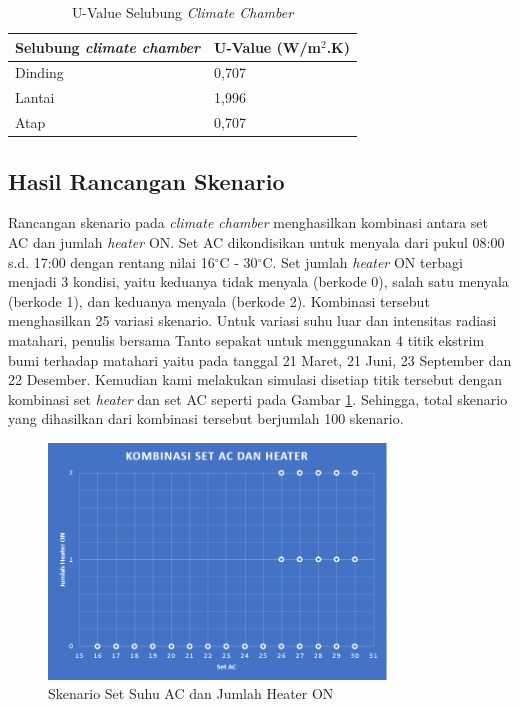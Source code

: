 \begin{table}[hbt!]
	\caption{U-Value Selubung \textit{Climate Chamber}}
	\label{tbl:5:UValue}
	\centering
	\begin{tabular}{|l|l|}
		\hline
		\textbf{Selubung \textit{climate chamber}} & \textbf{U-Value (W/m$^2$.K)} \\ \hline
		Dinding & 0,707 \\ \hline
		Lantai  & 1,996 \\ \hline
		Atap    & 0,707 \\ \hline
	\end{tabular}
\end{table}

\subsection{Hasil Rancangan Skenario}
Rancangan skenario pada \textit{climate chamber} menghasilkan kombinasi antara set AC dan jumlah \textit{heater} ON. Set AC dikondisikan untuk menyala dari pukul 08:00 s.d. 17:00 dengan rentang nilai 16$^\circ$C - 30$^\circ$C. Set jumlah \textit{heater} ON terbagi menjadi 3 kondisi, yaitu keduanya tidak menyala (berkode 0), salah satu menyala (berkode 1), dan keduanya menyala (berkode 2). Kombinasi tersebut menghasilkan 25 variasi skenario. Untuk variasi suhu luar dan intensitas radiasi matahari, penulis bersama Tanto sepakat untuk menggunakan 4 titik ekstrim bumi terhadap matahari yaitu pada tanggal 21 Maret, 21 Juni, 23 September dan 22 Desember. Kemudian kami melakukan simulasi disetiap titik tersebut dengan kombinasi set \textit{heater} dan set AC seperti pada Gambar \ref{fig:5:HeaterAC}. Sehingga, total skenario yang dihasilkan dari kombinasi tersebut berjumlah 100 skenario.
\begin{figure}[!h]
	\centering
	\includegraphics[width=0.8\textwidth]{figures/HeaterAC}
	\caption{Skenario Set Suhu AC dan Jumlah Heater ON}
	\label{fig:5:HeaterAC}
\end{figure}


